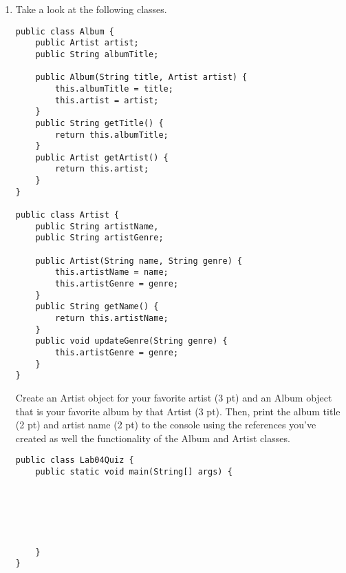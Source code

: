 \Instructions
\begin{enumerate}

\item {} Take a look at the following classes.  

\begin{lstlisting}
public class Album {
	public Artist artist;
	public String albumTitle;

	public Album(String title, Artist artist) {
		this.albumTitle = title;
		this.artist = artist;
	}
	public String getTitle() {
		return this.albumTitle;
	}
	public Artist getArtist() {
		return this.artist;
	}
}

public class Artist {
	public String artistName, 
    public String artistGenre;

	public Artist(String name, String genre) {
		this.artistName = name;
		this.artistGenre = genre;
	}
	public String getName() {
		return this.artistName;
	}
	public void updateGenre(String genre) {
		this.artistGenre = genre;
	}
}
\end{lstlisting}
Create an Artist object for your favorite artist (3 pt) and an Album object that is your favorite album by that Artist (3 pt).  Then, print the album title (2 pt) and artist name (2 pt) to the console using the references you've created as well the functionality of the Album and Artist classes. 
\begin{lstlisting}
public class Lab04Quiz {
	public static void main(String[] args) {

        
        
        
        
        
	}	
}
\end{lstlisting}
\end{enumerate}